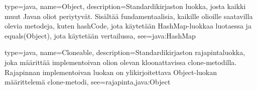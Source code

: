 {
	type=java,
	name=Object,
	description={Standardikirjaston luokka, josta kaikki muut Javan oliot periytyvät. Sisältää
fundamentaalisia, kaikille olioille saatavilla olevia metodeja, kuten hashCode, jota käytetään
HashMap-luokkaa luotaessa ja equals(Object), jota käytetään vertailussa},
	see=java:HashMap
}

{
	type=java,
	name=Cloneable,
	description={Standardikirjaston rajapintaluokka, joka määrittää implementoivan olion olevan
kloonattavissa clone-metodilla. Rajapinnan implementoivan luokan on ylikirjoitettava Object-luokan
määrittelemä clone-metodi},
	see={rajapinta,java:Object}
}